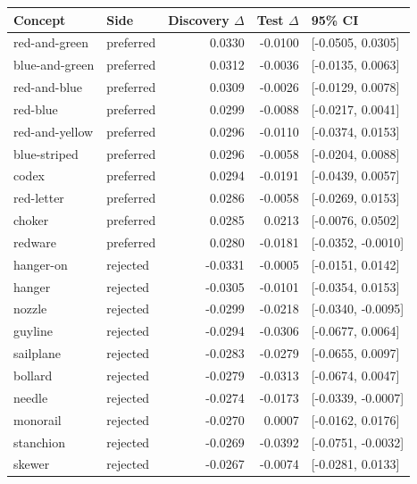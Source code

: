 \begin{tabular}{llrrl}
\toprule
Concept & Side & Discovery $\Delta$ & Test $\Delta$ & 95\% CI \\
\midrule
red-and-green & preferred & 0.0330 & -0.0100 & [-0.0505, 0.0305] \\
blue-and-green & preferred & 0.0312 & -0.0036 & [-0.0135, 0.0063] \\
red-and-blue & preferred & 0.0309 & -0.0026 & [-0.0129, 0.0078] \\
red-blue & preferred & 0.0299 & -0.0088 & [-0.0217, 0.0041] \\
red-and-yellow & preferred & 0.0296 & -0.0110 & [-0.0374, 0.0153] \\
blue-striped & preferred & 0.0296 & -0.0058 & [-0.0204, 0.0088] \\
codex & preferred & 0.0294 & -0.0191 & [-0.0439, 0.0057] \\
red-letter & preferred & 0.0286 & -0.0058 & [-0.0269, 0.0153] \\
choker & preferred & 0.0285 & 0.0213 & [-0.0076, 0.0502] \\
redware & preferred & 0.0280 & -0.0181 & [-0.0352, -0.0010] \\
hanger-on & rejected & -0.0331 & -0.0005 & [-0.0151, 0.0142] \\
hanger & rejected & -0.0305 & -0.0101 & [-0.0354, 0.0153] \\
nozzle & rejected & -0.0299 & -0.0218 & [-0.0340, -0.0095] \\
guyline & rejected & -0.0294 & -0.0306 & [-0.0677, 0.0064] \\
sailplane & rejected & -0.0283 & -0.0279 & [-0.0655, 0.0097] \\
bollard & rejected & -0.0279 & -0.0313 & [-0.0674, 0.0047] \\
needle & rejected & -0.0274 & -0.0173 & [-0.0339, -0.0007] \\
monorail & rejected & -0.0270 & 0.0007 & [-0.0162, 0.0176] \\
stanchion & rejected & -0.0269 & -0.0392 & [-0.0751, -0.0032] \\
skewer & rejected & -0.0267 & -0.0074 & [-0.0281, 0.0133] \\
\bottomrule
\end{tabular}
